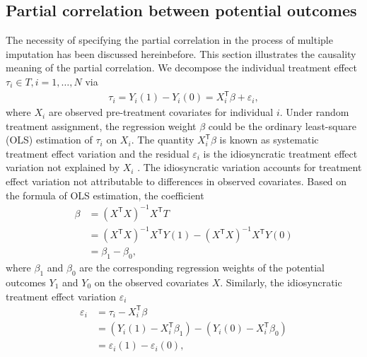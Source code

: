 	\subsection{Partial correlation between potential outcomes}
	The necessity of specifying the partial correlation in the process of multiple imputation has been discussed hereinbefore. This section illustrates the causality meaning of the partial correlation. We decompose the individual treatment effect $\tau_{i} \in T, i = 1, \dots, N$ via
	\begin{equation}
		\begin{array}{lr}
			\tau_{i} = Y_{i}(1) - Y_{i}(0) = X_{i}^{\mathsf{T}}\beta + \varepsilon_{i},
		\end{array}
	\end{equation}
	where $X_{i}$ are observed pre-treatment covariates for individual $i$. Under random treatment assignment, the regression weight $\beta$ could be the ordinary least-square (OLS) estimation of $\tau_{i}$ on $X_{i}$. The quantity $X_{i}^{\mathsf{T}}\beta$ is known as systematic treatment effect variation and the residual $\varepsilon_{i}$ is the idiosyncratic treatment effect variation not explained by $X_{i}$ \citep{ding2019decomposing, heckman1997making, djebbari2008heterogeneous}. The idiosyncratic variation accounts for treatment effect variation not attributable to differences in observed covariates. Based on the formula of OLS estimation, the coefficient 
	\begin{equation}
		\begin{array}{cl}
			\beta &= (X^{\mathsf{T}}X)^{-1}X^{\mathsf{T}}T \\
			&= (X^{\mathsf{T}}X)^{-1}X^{\mathsf{T}}Y(1) - (X^{\mathsf{T}}X)^{-1}X^{\mathsf{T}}Y(0) \\
			&= \beta_{1} -\beta_{0},
		\end{array}
	\end{equation}
	where $\beta_{1}$ and $\beta_{0}$ are the corresponding regression weights of the potential outcomes $Y_{1}$ and $Y_{0}$ on the observed covariates $X$. Similarly, the idiosyncratic treatment effect variation $\varepsilon_{i}$
	\begin{equation}
		\begin{array}{cl}
			\varepsilon_{i} &= \tau_{i} - X_{i}^{\mathsf{T}}\beta\\
			&= (Y_{i}(1)  - X_{i}^{\mathsf{T}}\beta_{1}) - (Y_{i}(0) - X_{i}^{\mathsf{T}}\beta_{0})\\
			&= \varepsilon_{i}(1) -\varepsilon_{i}(0),
		\end{array}
	\end{equation} 
